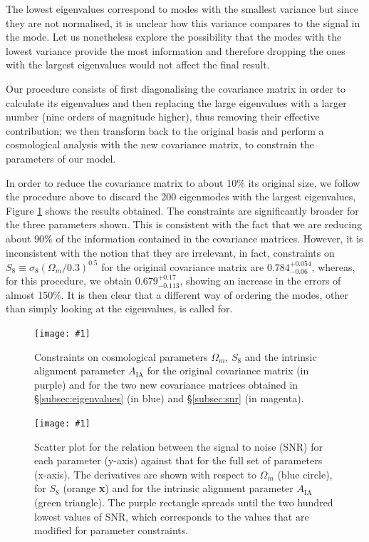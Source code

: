 \documentclass[twocolumn]{\docclass}
\newcommand{\sfig}[2]{
	\texttt{[image: \#1]}
}
\newcommand{\Sfig}[2]{
	\begin{figure}[thbp]
		\sfig{../figures/#1.pdf}{\columnwidth}
		\caption{{\small #2}}
		\label{fig:#1}
	\end{figure}
}
\newcommand{\Svwide}[2]{
	\begin{figure}[thbp]
		\sfig{../figures/#1.pdf}{\textwidth}
		\caption{{\small #2}}
		\label{fig:#1}
	\end{figure}
}
\newcommand{\rf}[1]{Figure \ref{fig:#1}}
\newcommand{\rssec}[1]{\S\ref{subsec:#1}}
\begin{document}
	The lowest eigenvalues correspond to modes with the smallest variance but since they are not normalised, it is unclear how this variance compares to the signal in the mode. Let us nonetheless explore the possibility that the modes with the lowest variance provide the most information and therefore dropping the ones with the largest eigenvalues would not affect the final result.
	
	Our procedure consists of first diagonalising the covariance matrix in order to calculate its eigenvalues and then replacing the large eigenvalues with a larger number (nine orders of magnitude higher), thus removing their effective contribution; we then transform back to the original basis and perform a cosmological analysis with the new covariance matrix, to constrain the parameters of our model. 
	
	In order to reduce the covariance matrix to about 10\% its original size, we follow the procedure above to discard the 200 eigenmodes with the largest eigenvalues, \rf{EigSNR-constraints_wmS8A} shows the results obtained.  The constraints are significantly broader for the three parameters shown. This is consistent with the fact that we are reducing about 90\% of the information contained in the covariance matrices. However, it is inconsistent with the notion that they are irrelevant, in fact, constraints on $S_8\equiv \sigma_8 (\Omega_m/0.3)^{0.5}$ for the original covariance matrix are $0.784^{+ 0.054}_{- 0.06}$, whereas, for this procedure, we obtain $0.679^{+ 0.17}_{- 0.113}$, showing an increase in the errors of almost 150\%. It is then clear that a different way of ordering the modes, other than simply looking at the eigenvalues, is called for.	
	
	\Sfig{EigSNR-constraints_wmS8A}{Constraints on cosmological parameters $\Omega_m$, $S_8$ and the intrinsic alignment parameter $A_{\mathrm{IA}}$ for the original covariance matrix (in purple) and for the two new covariance matrices obtained in \rssec{eigenvalues} (in blue) and \rssec{snr} (in magenta).}
	
	\Svwide{SNR_cuts200}{Scatter plot for the relation between the signal to noise (SNR)  for each parameter (y-axis) against that for the full set of parameters (x-axis). The derivatives are shown with respect to $\Omega_m$ (blue circle), for $S_8$ (orange \textbf{x}) and for the intrinsic alignment parameter $A_{\mathrm{IA}}$ (green triangle). The purple rectangle spreads until the two hundred lowest values of SNR, which corresponds to the values that are modified for parameter constraints.}
	
\end{document}
